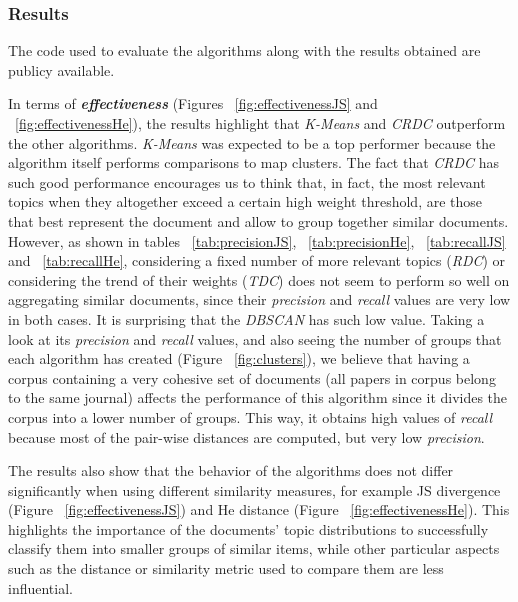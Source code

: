 \subsubsection{Results}
\label{sec:clustering-results}

The code used to evaluate the algorithms along with the results obtained are publicy available\citep{Badenes-Olmedo2017a}.

In terms of \textbf{\textit{effectiveness}} (Figures ~\ref{fig:effectivenessJS} and ~\ref{fig:effectivenessHe}), the results highlight that \textit{K-Means} and \textit{CRDC} outperform the other algorithms. \textit{K-Means} was expected to be a top performer because the algorithm itself performs comparisons to map clusters. The fact that \textit{CRDC} has such good performance encourages us to think that, in fact, the most relevant topics when they altogether exceed a certain high weight threshold, are those that best represent the document and allow to group together similar documents. However, as shown in tables ~\ref{tab:precisionJS}, ~\ref{tab:precisionHe}, ~\ref{tab:recallJS} and ~\ref{tab:recallHe}, considering a fixed number of more relevant topics (\textit{RDC}) or considering the trend of their weights (\textit{TDC}) does not seem to perform so well on aggregating similar documents, since their \textit{precision} and \textit{recall} values are very low in both cases. It is surprising that the \textit{DBSCAN} has such low value. Taking a look at its \textit{precision} and \textit{recall} values, and also seeing the number of groups that each algorithm has created (Figure ~\ref{fig:clusters}), we believe that having a corpus containing a very cohesive set of documents (all papers in corpus belong to the same journal) affects the performance of this algorithm since it divides the corpus into a lower number of groups. This way, it obtains high values of \textit{recall} because most of the pair-wise distances are computed, but very low \textit{precision}.

The results also show that the behavior of the algorithms does not differ significantly when using different similarity measures, for example JS divergence (Figure ~\ref{fig:effectivenessJS}) and He distance (Figure ~\ref{fig:effectivenessHe}). This highlights the importance of the documents' topic distributions to successfully classify them into smaller groups of similar items, while other particular aspects such as the distance or similarity metric used to compare them are less influential.

